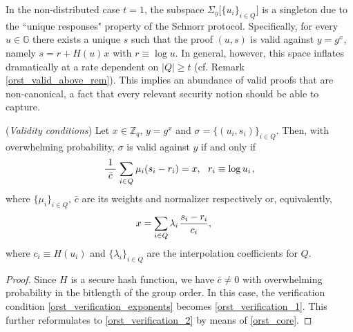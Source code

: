 \documentclass{iacrtrans}
\begin{document}
\begin{rem}
In the non-distributed case $t=1$, the subspace
$\Sigma_y \big[\{u_i\}_{i \in Q}\big]$
is a singleton due to the ``unique responses" property
of the Schnorr protocol.
Specifically, for every $u \in \mathbb{G}$
there exists a unique $s$
such that the proof $(u, s)$ is valid against $y=g^x$,
namely $s = r + H(u)\hspace{1pt}x$ with $r \equiv \log u$.
In general, however,
this space inflates dramatically
at a rate dependent on $|Q| \ge t$
(cf. Remark \ref{orst_valid_above_rem}).
This implies an abundance of valid proofs that
are non-canonical, a fact that
every relevant security notion should be able to capture.
\end{rem}

\begin{prop}\label{orst_validity_conditions}
\textup{(\textit{Validity conditions})}
Let $x \in \mathbb{Z}_q$, $y = g ^ x$ and
$\sigma = \{(u_i, s_i)\}_{i \in Q}$.
Then, with overwhelming probability,
$\sigma$ is valid against $y$
if and only if
\vspace{5pt}
\begin{equation}\label{orst_verification_1}
\frac{1}{\ \bar{c}\ }
\hspace{1pt}
\sum_{i \in Q}
	\hspace{0.5pt} \mu_i (s_i - r_i)
=
x,
\ \ r_i \equiv \log u_i\hspace{1pt},
\vspace{5pt}
\end{equation}
where $\{\mu_i\}_{i \in Q}$, $\bar{c}$
are its weights and normalizer respectively
or, equivalently,
\vspace{5pt}
\begin{equation}\label{orst_verification_2}
\hspace{-12pt}x
=
\sum_{i \in Q} \lambda_i\hspace{1pt}\frac{s_i - r_i}{c_i},
\vspace{5pt}
\end{equation}
where $c_i \equiv H(u_i)$
and $\{\lambda_i\}_{i \in Q}$ are the interpolation
coefficients for $Q$.
\end{prop}

\begin{proof}
Since $H$
is a secure hash function,
we have
$\bar{c} \neq 0$ with overwhelming probability
in the bitlength of the group order.
In this case,
the verification condition \eqref{orst_verification_exponents}
becomes \eqref{orst_verification_1}.
This further reformulates to
\eqref{orst_verification_2} by means of \eqref{orst_core}.
\vspace{5pt}
\end{proof}
\end{document}
